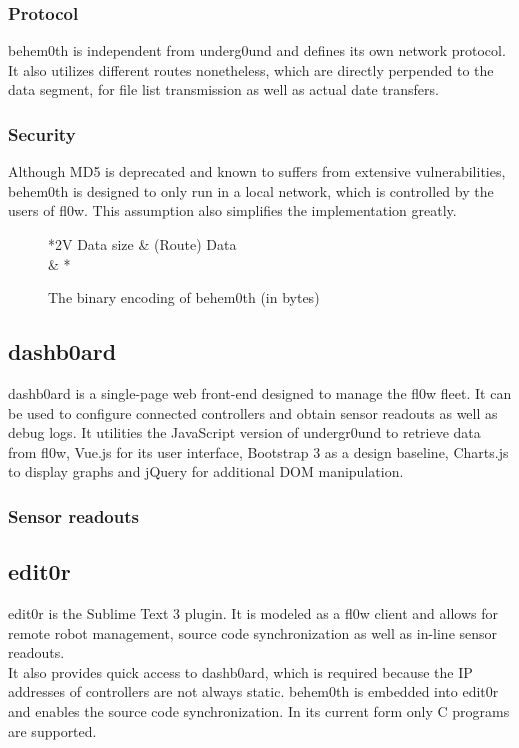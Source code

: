 \documentclass[conference]{IEEEtran}
\begin{document}
\subsubsection{Protocol}
behem0th is independent from underg0und and defines its own network protocol. It also utilizes different routes nonetheless, which are directly perpended to the data segment, for file list transmission as well as actual date transfers.\\

\subsubsection{Security}
Although MD5 is deprecated and known to suffers from extensive vulnerabilities, behem0th is designed to only run in a local network, which is controlled by the users of fl0w. This assumption also simplifies the implementation greatly.\\

\begin{figure}[H]
\centering
	\begin{tabular}{*{2}{V}}
		Data size & (Route) Data \\  & * \\
	\end{tabular}
	\caption{The binary encoding of behem0th (in bytes)}
\label{fig:behem0th_header}
\end{figure}


\subsection{dashb0ard}
dashb0ard is a single-page web front-end designed to manage the fl0w fleet. It can be used to configure connected controllers and obtain sensor readouts as well as debug logs. It utilities the JavaScript version of undergr0und to retrieve data from fl0w, Vue.js for its user interface, Bootstrap 3\cite{Bootstrap 3:Twitter Inc.} as a design baseline, Charts.js to display graphs and jQuery\cite{jQuery:jQuery Foundation} for additional DOM manipulation.

\subsubsection{Sensor readouts}


\subsection{edit0r}
edit0r is the Sublime Text 3 plugin. It is modeled as a fl0w client and allows for remote robot management, source code synchronization as well as in-line sensor readouts. \\It also provides quick access to dashb0ard, which is required because the IP addresses of controllers are not always static. behem0th\cite{behem0th:Christoph Heiss} is embedded into edit0r and enables the source code synchronization. In its current form only C programs are supported.\\
\end{document}
